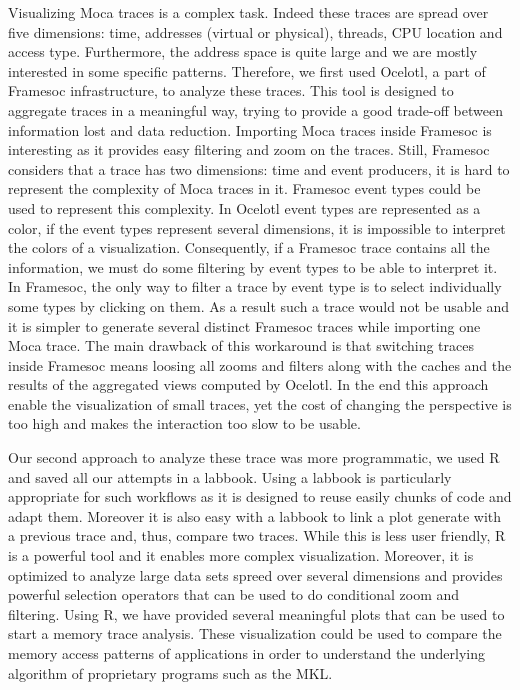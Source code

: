 Visualizing \gls{Moca} traces is a complex task.
Indeed these traces are spread over five dimensions: time, addresses (virtual or physical), threads, \gls{CPU} location and access type.
Furthermore, the address space is quite large and we are mostly interested in some specific patterns.
Therefore, we first used \gls{Ocelotl}, a part of \gls{Framesoc} infrastructure, to analyze these traces.
This tool is designed to aggregate traces in a meaningful way, trying to provide a good trade-off between information lost and data reduction.
Importing \gls{Moca} traces inside \gls{Framesoc} is interesting as it provides easy filtering and zoom on the traces.
Still, \gls{Framesoc} considers that a trace has two dimensions: time and event producers, it is hard to represent the complexity of \gls{Moca} traces in it.
\gls{Framesoc} event types could be used to represent this complexity.
In \gls{Ocelotl} event types are represented as a color, if the event types represent several dimensions, it is impossible to interpret the colors of a visualization.
Consequently, if a \gls{Framesoc} trace contains all the information, we must do some filtering by event types to be able to interpret it.
In \gls{Framesoc}, the only way to filter a trace by event type is to select individually some types by clicking on them.
As a result such a trace would not be usable and it is simpler to generate several distinct \gls{Framesoc} traces while importing one \gls{Moca} trace.
The main drawback of this workaround is that switching traces inside \gls{Framesoc} means loosing all zooms and filters along with the caches and the results of the aggregated views computed by \gls{Ocelotl}.
In the end this approach enable the visualization of small traces, yet the cost of changing the perspective is too high and makes the interaction too slow to be usable.

Our second approach to analyze these trace was more programmatic, we used \gls{R} and saved all our attempts in a labbook.
Using a labbook is particularly appropriate for such workflows as it is designed to reuse easily chunks of code and adapt them.
Moreover it is also easy with a labbook to link a plot generate with a previous trace and, thus, compare two traces.
While this is less user friendly, \gls{R} is a powerful tool and it enables more complex visualization.
Moreover, it is optimized to analyze large data sets spreed over several dimensions and provides powerful selection operators that can be used to do conditional zoom and filtering.
Using \gls{R}, we have provided several meaningful plots that can be used to start a memory trace analysis.
These visualization could be used to compare the memory access patterns of applications in order to understand the underlying algorithm of proprietary programs such as the \gls{MKL}.

